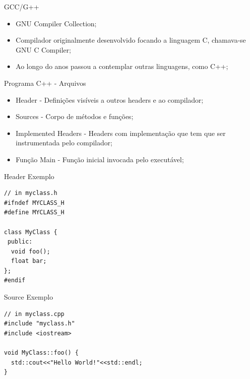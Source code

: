 \documentclass[12pt,table,xcolor={dvipsnames}]{beamer}
\begin{document}
\begin{frame}{GCC/G++}
\begin{itemize}
\item GNU Compiler Collection;
\item Compilador originalmente desenvolvido focando a linguagem C, chamava-se GNU C
Compiler;
\item Ao longo do anos passou a contemplar outras linguagens, como C++;
\end{itemize}
\end{frame}

\begin{frame}{Programa C++ - Arquivos}
\begin{itemize}
\item Header - Definições visíveis a outros headers e ao compilador;
\item Sources - Corpo de métodos e funções;
\item Implemented Headers - Headers com implementação que tem que ser instrumentada pelo compilador;
\item Função Main - Função inicial invocada pelo executável;
\end{itemize}
\end{frame}

\begin{frame}[fragile]{Header Exemplo}
\begin{lstlisting}
// in myclass.h
#ifndef MYCLASS_H
#define MYCLASS_H

class MyClass {
 public:
  void foo();
  float bar;
};
#endif
\end{lstlisting}
\end{frame}

\begin{frame}[fragile]{Source Exemplo}
\begin{lstlisting}
// in myclass.cpp
#include "myclass.h"
#include <iostream>

void MyClass::foo() {
  std::cout<<"Hello World!"<<std::endl;
}
\end{lstlisting}
\end{frame}
\end{document}
